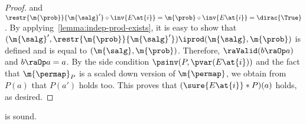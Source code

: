 \begin{proof}
  and $\restr{\m{\prob}}{\m{\salg}'} \circ \inv{E\at{i}}
  = \m{\prob} \circ \inv{E\at{i}} = \dirac{\True}$.
  By applying~\cref{lemma:indep-prod-exists}, it is easy to show that
  $(\m{\salg}', \restr{\m{\prob}}{\m{\salg}'}) \iprod (\m{\salg}, \m{\prob})$
  is defined and is equal to $(\m{\salg}, \m{\prob})$.
  Therefore,
  $\raValid(b \raOp a)$ and $b \raOp a = a$.
  By the side condition $\psinv(P, \pvar(E\at{i}))$ and the fact that
  $\m{\permap}_{P}$ is a scaled down version of $\m{\permap}$,
  we obtain from $P(a)$ that $P(a')$ holds too.
  This proves that
  $(\sure{E\at{i}} \ast P)(a)$ holds, as desired.
\end{proof} \begin{lemma}
\label{proof:prod-split}
   is sound.
\end{lemma}

